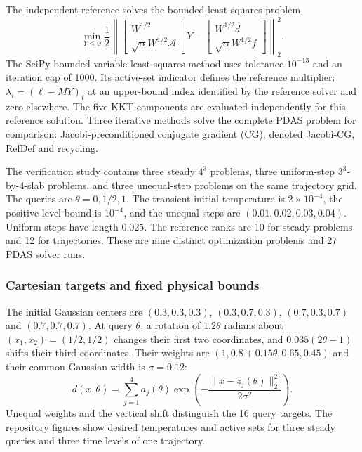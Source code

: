 The independent reference solves the bounded least-squares problem
\begin{equation}\label{eq:si_cht_bvls}
 \min_{Y\leq\psi}\frac12\left\|
 \begin{bmatrix}W^{1/2}\\\sqrt\alpha W^{1/2}\mathcal A\end{bmatrix}Y
 -
 \begin{bmatrix}W^{1/2}d\\\sqrt\alpha W^{1/2}f\end{bmatrix}
 \right\|_2^2.
\end{equation}
The SciPy bounded-variable least-squares method uses tolerance
$10^{-13}$ and an iteration cap of 1000. Its active-set indicator
defines the reference multiplier: $\lambda_i=(\ell-MY)_i$ at an
upper-bound index identified by the reference solver and zero elsewhere. The five KKT
components are evaluated independently for this reference solution.
Three iterative methods solve the complete PDAS problem for comparison:
Jacobi-preconditioned conjugate gradient (CG), denoted Jacobi-CG, RefDef and
recycling.

The verification study contains three steady $4^3$ problems,
three uniform-step $3^3$-by-4-slab problems, and three unequal-step
problems on the same trajectory grid. The queries are
$\theta=0,1/2,1$. The transient initial temperature is
$2\times10^{-4}$, the positive-level bound is $10^{-4}$, and the
unequal steps are $(0.01,0.02,0.03,0.04)$. Uniform steps have length
$0.025$. The reference ranks are 10 for steady problems and 12
for trajectories. These are nine distinct optimization
problems and 27 PDAS solver runs.


\subsubsection{Cartesian targets and fixed physical bounds}
\label{si:targets}
The initial Gaussian centers are
$(0.3,0.3,0.3)$, $(0.3,0.7,0.3)$, $(0.7,0.3,0.7)$ and
$(0.7,0.7,0.7)$. At query $\theta$, a rotation of $1.2\theta$
radians about $(x_1,x_2)=(1/2,1/2)$ changes their first two
coordinates, and $0.035(2\theta-1)$ shifts their third coordinates.
Their weights are $(1,0.8+0.15\theta,0.65,0.45)$ and their common
Gaussian width is $\sigma=0.12$:
\[
 d(x,\theta)=\sum_{j=1}^4 a_j(\theta)
 \exp\left(-\frac{\|x-z_j(\theta)\|_2^2}{2\sigma^2}\right).
\]
Unequal weights and the vertical shift distinguish the 16
query targets. The \href{https://github.com/teeratornk/deflation-example/blob/ba682dd05b168d2f43ff0c58050813deee785223/docs/supplementary-figures.md#cartesian-target-fields}
{repository figures} show desired temperatures and active sets for three
steady queries and three time levels of one trajectory.

